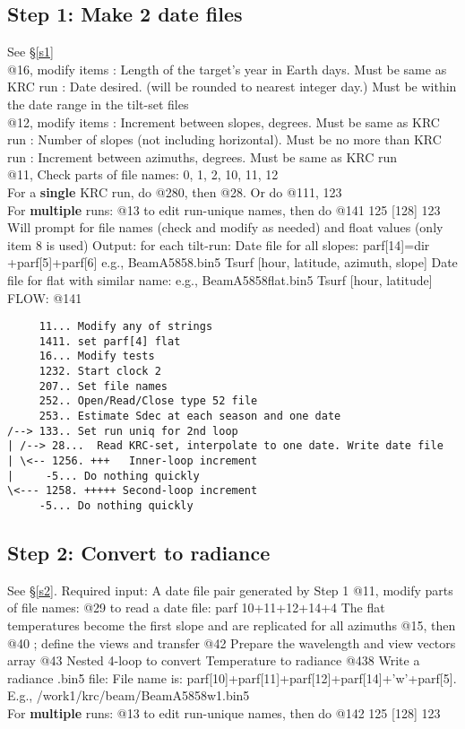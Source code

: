 \documentclass{article}
\begin{document}
\subsection{Step 1: Make 2 date files}
See \S \ref{s1} 
\\ @16, modify items 
: Length of the target's year in Earth days. Must be same as KRC run
: Date desired. (will be rounded to nearest integer day.) 
\qii Must be within the date range in the tilt-set files 
\\ @12,  modify items
: Increment between slopes, degrees. Must be same as KRC run
: Number of slopes (not including horizontal). Must be no more than KRC run 
: Increment between azimuths, degrees. Must be same as KRC run
\\ @11, Check parts of file names: 0, 1, 2, 10, 11, 12
\\ For a \textbf{single} KRC run, do @280, then @28. Or do @111, 123
\\ For \textbf{multiple} runs: @13 to edit run-unique names, then do @141 125 [128] 123
\qii  Will prompt for file names (check and modify as needed) and float values (only item 8 is used)
\qi Output: for each tilt-run: 
\qii Date file for all slopes: parf[14]=dir +parf[5]+parf[6] e.g., BeamA5858.bin5
\qiii Tsurf [hour, latitude, azimuth, slope]
\qii Date file for flat with similar name: e.g., BeamA5858flat.bin5
\qiii Tsurf [hour, latitude]
\\ FLOW: @141
\vspace{-3.mm} 
\begin{verbatim}
     11... Modify any of strings 
     1411. set parf[4] flat
     16... Modify tests
     1232. Start clock 2  
     207.. Set file names
     252.. Open/Read/Close type 52 file 
     253.. Estimate Sdec at each season and one date
/--> 133.. Set run uniq for 2nd loop
| /--> 28...  Read KRC-set, interpolate to one date. Write date file
| \<-- 1256. +++   Inner-loop increment
|     -5... Do nothing quickly
\<--- 1258. +++++ Second-loop increment
     -5... Do nothing quickly
\end{verbatim}  

\subsection{Step 2: Convert to radiance}
See \S \ref{s2}. Required input: A date file pair generated by Step 1
\qi @11, modify parts of file names:
\qi @29 to read a date file: parf  10+11+12+14+4
\qii The flat temperatures become the first slope and  are replicated for all azimuths
\qi @15, then @40  ; define the views and transfer
\qi @42 Prepare the wavelength and view vectors array 
\qi @43 Nested 4-loop to convert Temperature to radiance
\qi @438 Write a radiance .bin5 file:
\qii File name is: parf[10]+parf[11]+parf[12]+parf[14]+'w'+parf[5]. E.g., /work1/krc/beam/BeamA5858w1.bin5
\\ For \textbf{multiple} runs: @13 to edit run-unique names, then do @142 125 [128] 123
\end{document}
